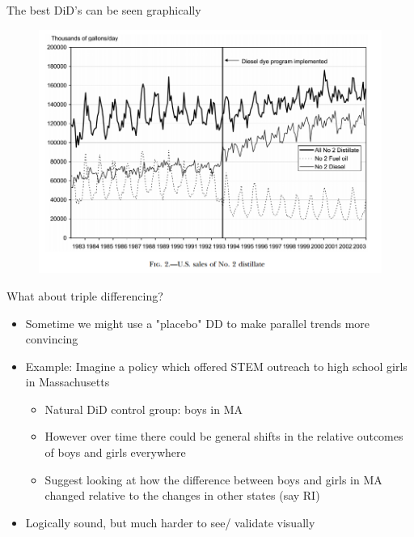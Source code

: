 \begin{frame}{The best DiD's can be seen graphically}
  \begin{figure}
  \centering
  \includegraphics[width=\textwidth]{./resources/muehlegger_dying}
  \end{figure}
\end{frame}

\begin{frame}{What about triple differencing?}
  \begin{itemize}
  \item Sometime we might use a "placebo" DD to make parallel trends more convincing
  \item Example: Imagine a policy which offered STEM outreach to high school girls in Massachusetts 
  \begin{itemize}
    \item Natural DiD control group: boys in MA 
    \item However over time there could be general shifts in the relative outcomes of boys and girls everywhere
    \item Suggest looking at how the difference between boys and girls in MA changed relative to the changes in other states (say RI)
  \end{itemize}
  \item Logically sound, but much harder to see/ validate visually
  \end{itemize}
\end{frame}

